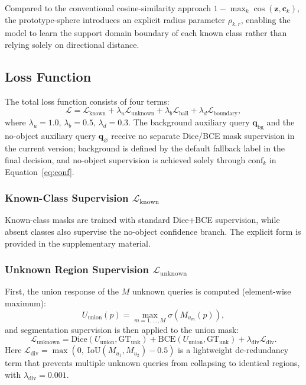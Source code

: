 \documentclass[journal]{IEEEtai}
\newcommand{\bq}{\mathbf{q}}
\newcommand{\bz}{\mathbf{z}}
\begin{document}
Compared to the conventional cosine-similarity approach
$1 - \max_k \cos(\bz, \mathbf{c}_k)$, the prototype-sphere introduces an explicit
radius parameter $\rho_{k,r}$, enabling the model to learn the support domain boundary
of each known class rather than relying solely on directional distance.

\subsection{Loss Function}\label{sec:method:loss}

The total loss function consists of four terms:
\begin{equation}\label{eq:total_loss}
  \mathcal{L} = \mathcal{L}_{\text{known}} + \lambda_u \mathcal{L}_{\text{unknown}} + \lambda_b \mathcal{L}_{\text{ball}} + \lambda_d \mathcal{L}_{\text{boundary}},
\end{equation}
where $\lambda_u = 1.0$, $\lambda_b = 0.5$, $\lambda_d = 0.3$.
The background auxiliary query $\bq_{\text{bg}}$ and the no-object auxiliary query
$\bq_{\varnothing}$ receive no separate Dice/BCE mask supervision in the current
version; background is defined by the default fallback label in the final decision,
and no-object supervision is achieved solely through $\text{conf}_k$ in
Equation~\eqref{eq:conf}.

\subsubsection{Known-Class Supervision \texorpdfstring{$\mathcal{L}_{\text{known}}$}{L\_known}}\label{sec:method:loss:known}

Known-class masks are trained with standard Dice+BCE supervision, while absent classes
also supervise the no-object confidence branch. The explicit form is provided in the
supplementary material.

\subsubsection{Unknown Region Supervision \texorpdfstring{$\mathcal{L}_{\text{unknown}}$}{L\_unknown}}\label{sec:method:loss:unknown}

First, the union response of the $M$ unknown queries is computed (element-wise maximum):
\begin{equation}\label{eq:u_union}
  U_{\text{union}}(p) = \max_{m=1,\ldots,M} \sigma\!\left(M_{u_m}(p)\right),
\end{equation}
and segmentation supervision is then applied to the union mask:
\begin{equation}\label{eq:loss_unknown}
  \mathcal{L}_{\text{unknown}} = \text{Dice}(U_{\text{union}}, \text{GT}_{\text{unk}}) + \text{BCE}(U_{\text{union}}, \text{GT}_{\text{unk}}) + \lambda_{\text{div}} \mathcal{L}_{\text{div}}.
\end{equation}
Here $\mathcal{L}_{\text{div}} = \max\!\left(0,\; \text{IoU}(M_{u_1}, M_{u_2}) - 0.5\right)$
is a lightweight de-redundancy term that prevents multiple unknown queries from
collapsing to identical regions, with $\lambda_{\text{div}} = 0.001$.
\end{document}
